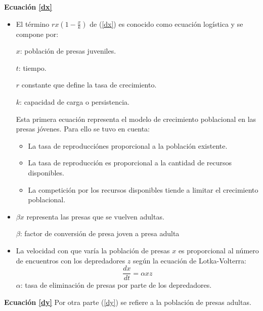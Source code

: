 \documentclass{wscpaperproc}
\theoremstyle{wsc}
\begin{document}
{\bf Ecuación \ref*{dx}}
\begin{itemize}
	\item El término $rx(1-\frac{x}{k})$ de (\ref*{dx}) es conocido como ecuación
	      logística y se compone por:
	      \vspace*{0.3cm}

	      $x$: población de presas juveniles.

	      $t$: tiempo.

	      $r$ constante que define la tasa de crecimiento.

	      $k$: capacidad de carga o persistencia.

	      \vspace*{0.5cm}

	      Esta primera ecuación representa el modelo de crecimiento poblacional en las
	      presas jóvenes. Para ello se tuvo en cuenta:
	      \begin{itemize}
		      \item La tasa de reproducciónes proporcional a la población existente.
		      \item La tasa de reproducción es proporcional a la cantidad de recursos disponibles.
		      \item La competición por los recursos disponibles tiende a limitar el crecimiento poblacional.
	      \end{itemize}

	\item $\beta x$ representa las presas que se vuelven adultas.

	      \vspace*{0.3cm}

	      $\beta$: factor de conversión de presa joven a presa adulta

	      \vspace*{0.3cm}

	\item La velocidad con que varía la población de presas $x$ es proporcional al número de encuentros con los depredadores $z$ según la ecuación de Lotka-Volterra:
	      $$\frac{dx}{dt}=\alpha xz$$
	      $\alpha$: tasa de eliminación de presas por parte de los depredadores.
\end{itemize}

\vspace*{1cm}
{\bf Ecuación \ref*{dy}}
Por otra parte (\ref*{dy}) se refiere a la población de presas adultas.
\end{document}
